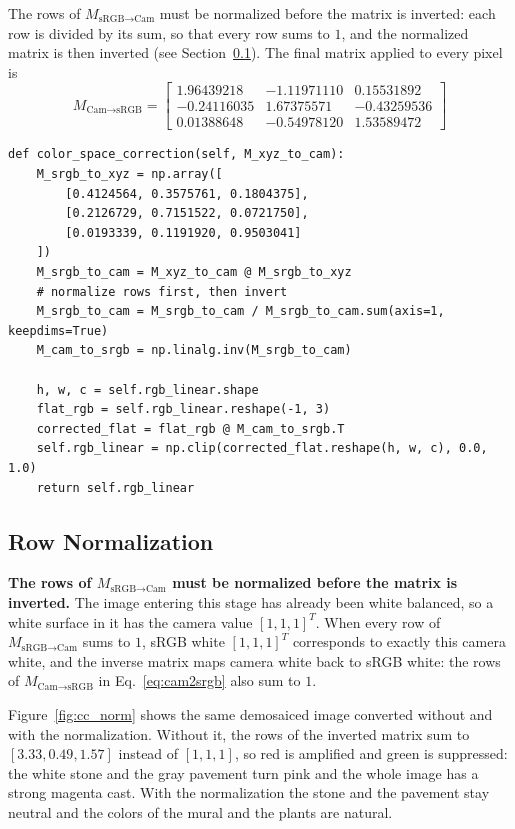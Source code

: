 \documentclass[a4paper]{article}
\begin{document}
The rows of $M_{\text{sRGB}\to\text{Cam}}$ must be normalized before the matrix is inverted: each row is divided by its sum, so that every row sums to $1$, and the normalized matrix is then inverted (see Section~\ref{sec:norm_order}). The final matrix applied to every pixel is
\begin{equation}
    M_{\text{Cam}\to\text{sRGB}} = \begin{bmatrix}
     1.96439218 & -1.11971110 &  0.15531892 \\
    -0.24116035 &  1.67375571 & -0.43259536 \\
     0.01388648 & -0.54978120 &  1.53589472
    \end{bmatrix}
    \label{eq:cam2srgb}
\end{equation}

\begin{lstlisting}
def color_space_correction(self, M_xyz_to_cam):
    M_srgb_to_xyz = np.array([
        [0.4124564, 0.3575761, 0.1804375],
        [0.2126729, 0.7151522, 0.0721750],
        [0.0193339, 0.1191920, 0.9503041]
    ])
    M_srgb_to_cam = M_xyz_to_cam @ M_srgb_to_xyz
    # normalize rows first, then invert
    M_srgb_to_cam = M_srgb_to_cam / M_srgb_to_cam.sum(axis=1, keepdims=True)
    M_cam_to_srgb = np.linalg.inv(M_srgb_to_cam)

    h, w, c = self.rgb_linear.shape
    flat_rgb = self.rgb_linear.reshape(-1, 3)
    corrected_flat = flat_rgb @ M_cam_to_srgb.T
    self.rgb_linear = np.clip(corrected_flat.reshape(h, w, c), 0.0, 1.0)
    return self.rgb_linear
\end{lstlisting}

\subsection{Row Normalization}
\label{sec:norm_order}
\textbf{The rows of $M_{\text{sRGB}\to\text{Cam}}$ must be normalized before the matrix is inverted.} The image entering this stage has already been white balanced, so a white surface in it has the camera value $[1, 1, 1]^T$. When every row of $M_{\text{sRGB}\to\text{Cam}}$ sums to $1$, sRGB white $[1, 1, 1]^T$ corresponds to exactly this camera white, and the inverse matrix maps camera white back to sRGB white: the rows of $M_{\text{Cam}\to\text{sRGB}}$ in Eq.~\eqref{eq:cam2srgb} also sum to $1$.

Figure~\ref{fig:cc_norm} shows the same demosaiced image converted without and with the normalization. Without it, the rows of the inverted matrix sum to $[3.33, 0.49, 1.57]$ instead of $[1, 1, 1]$, so red is amplified and green is suppressed: the white stone and the gray pavement turn pink and the whole image has a strong magenta cast. With the normalization the stone and the pavement stay neutral and the colors of the mural and the plants are natural.
\end{document}
